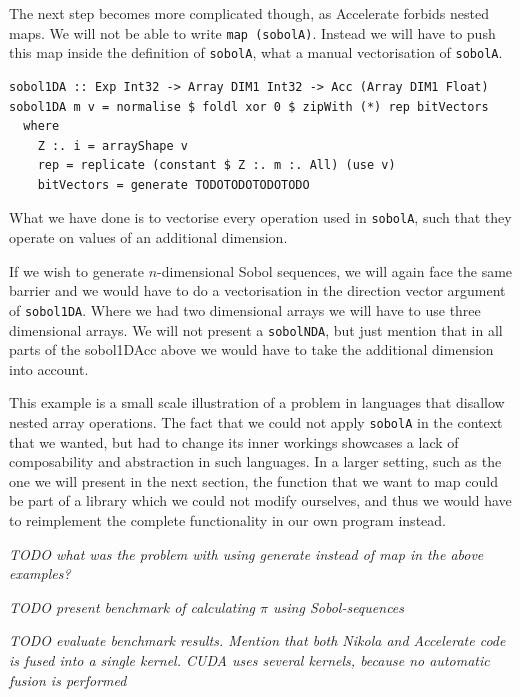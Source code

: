 \documentclass{llncs2e/llncs}
\begin{document}
The next step becomes more complicated though, as Accelerate forbids
nested maps. We will not be able to write \verb|map (sobolA)|.
Instead we will have to push this map inside the definition of
\verb|sobolA|, what a manual vectorisation of \verb|sobolA|.
\begin{verbatim}
sobol1DA :: Exp Int32 -> Array DIM1 Int32 -> Acc (Array DIM1 Float)
sobol1DA m v = normalise $ foldl xor 0 $ zipWith (*) rep bitVectors
  where
    Z :. i = arrayShape v
    rep = replicate (constant $ Z :. m :. All) (use v)
    bitVectors = generate TODOTODOTODOTODO
\end{verbatim}
What we have done is to vectorise every operation used in
\verb|sobolA|, such that they operate on values of an additional
dimension.

If we wish to generate $n$-dimensional Sobol sequences, we will again
face the same barrier and we would have to do a vectorisation in the
direction vector argument of \verb|sobol1DA|. Where we had two
dimensional arrays we will have to use three dimensional arrays. We
will not present a \verb|sobolNDA|, but just mention that in all
parts of the sobol1DAcc above we would have to take the additional
dimension into account.

This example is a small scale illustration of a problem in languages
that disallow nested array operations. The fact that we could not
apply \verb|sobolA| in the context that we wanted, but had to change
its inner workings showcases a lack of composability and abstraction
in such languages. In a larger setting, such as the one we will
present in the next section, the function that we want to map could be
part of a library which we could not modify ourselves, and thus we
would have to reimplement the complete functionality in our own
program instead.

\emph{TODO what was the problem with using generate instead of map in the
above examples?}

\emph{TODO present benchmark of calculating $\pi$ using Sobol-sequences}

\emph{TODO evaluate benchmark results. Mention that both Nikola and
  Accelerate code is fused into a single kernel. CUDA uses several
  kernels, because no automatic fusion is performed}
\end{document}
